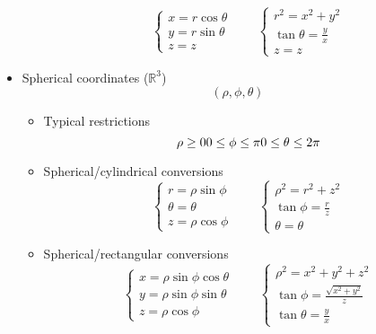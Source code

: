 \begin{itemize}
\begin{itemize}
					\begin{equation}
						\begin{cases}
							x = r \cos \theta \\
							y = r \sin \theta \\
							z = z
						\end{cases} \qquad \begin{cases}
							r^2 = x^2 + y^2 \\
							\tan \theta = \frac{y}{x} \\
							z = z
						\end{cases}
					\end{equation}
			\end{itemize}
		\item Spherical coordinates ($\mathbb{R}^3$)
			\begin{equation}
				(\rho, \phi, \theta)
			\end{equation}
			\begin{itemize}
				\item Typical restrictions
					\begin{equation}
						\rho \geq 0 \\
						0 \leq \phi \leq \pi \\
						0 \leq \theta \leq 2 \pi
					\end{equation}
				\item Spherical/cylindrical conversions
					\begin{equation}
						\begin{cases}
							r = \rho \sin \phi \\
							\theta = \theta \\
							z = \rho \cos \phi
						\end{cases} \qquad \begin{cases}
							\rho^2 = r^2 + z^2 \\
							\tan \phi = \frac{r}{z} \\
							\theta = \theta
						\end{cases}
					\end{equation}
				\item Spherical/rectangular conversions
					\begin{equation}
						\begin{cases}
							x = \rho \sin \phi \cos \theta \\
							y = \rho \sin \phi \sin \theta \\
							z = \rho \cos \phi
						\end{cases} \qquad \begin{cases}
							\rho^2 = x^2 + y^2 + z^2 \\
							\tan \phi = \frac{\sqrt{x^2+y^2}}{z} \\
							\tan \theta = \frac{y}{x}
						\end{cases}
					\end{equation}
			\end{itemize}
	\end{itemize}